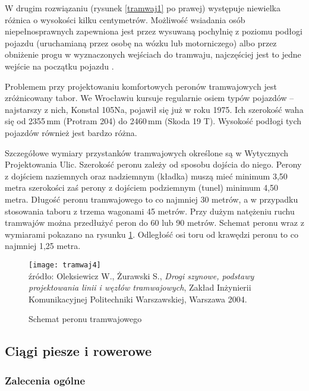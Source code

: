 \documentclass[twoside,12pt]{article}
\begin{document}
	W drugim rozwiązaniu (rysunek \ref{tramwaj1} po prawej) występuje niewielka różnica o wysokości kilku centymetrów. Możliwość wsiadania osób niepełnosprawnych zapewniona jest przez wysuwaną pochylnię z poziomu podłogi pojazdu (uruchamianą przez osobę na wózku lub motorniczego) albo przez obniżenie progu w wyznaczonych wejściach do tramwaju, najczęściej jest to jedne wejście na początku pojazdu \cite{makuch2}.
	
	Problemem przy projektowaniu komfortowych peronów tramwajowych jest zróżnicowany tabor. We Wrocławiu kursuje regularnie osiem typów pojazdów -- najstarszy z nich, Konstal 105Na, pojawił się już w roku 1975. Ich szerokość waha się od 2355\,mm (Protram 204) do 2460\,mm (Skoda 19 T). Wysokość podłogi tych pojazdów również jest bardzo różna. 
	
	Szczegółowe wymiary przystanków tramwajowych określone są w Wytycznych Projektowania Ulic. Szerokość peronu zależy od sposobu dojścia do niego. Perony z dojściem naziemnych oraz nadziemnym (kładka) muszą mieć minimum 3,50 metra szerokości zaś perony z dojściem podziemnym (tunel) minimum 4,50 metra. Długość peronu tramwajowego to co najmniej 30 metrów, a w przypadku stosowania taboru z trzema wagonami 45 metrów. Przy dużym natężeniu ruchu tramwajów można przedłużyć peron do 60 lub 90 metrów. Schemat peronu wraz z wymiarami pokazano na rysunku \ref{tramwaj4}. Odległość osi toru od krawędzi peronu to co najmniej 1,25 metra. 
	
		\begin{figure}[H]
		\centering
		\caption{Schemat peronu tramwajowego}
		\texttt{[image: tramwaj4]}\\
		\footnotesize{źródło: Oleksiewicz W., Żurawski S., \emph{Drogi szynowe, podstawy projektowania linii i węzłów tramwajowych}, Zakład Inżynierii Komunikacyjnej Politechniki Warszawskiej, Warszawa 2004. \cite{oleksiewicz}}
		\label{tramwaj4}
	\end{figure}	
	
	\clearpage
	\subsection{Ciągi piesze i rowerowe} \label{sec:ciagi_piesze}
	
	\subsubsection{Zalecenia ogólne}
	
\end{document}
